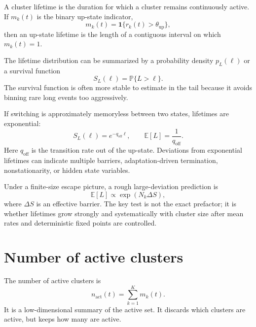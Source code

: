 A cluster lifetime is the duration for which a cluster remains continuously active. If $m_k(t)$ is the binary up-state indicator,
%
\begin{equation}
  m_k(t)
  =
  \mathbf{1}\{r_k(t)>\theta_{\mathrm{up}}\},
  \label{eq:cluster-up-indicator-ch05}
\end{equation}
%
then an up-state lifetime is the length of a contiguous interval on which $m_k(t)=1$.

The lifetime distribution can be summarized by a probability density $p_L(\ell)$ or a survival function
%
\begin{equation}
  S_L(\ell)
  =
  \mathbb{P}\{L>\ell\}.
  \label{eq:cluster-lifetime-survival}
\end{equation}
%
The survival function is often more stable to estimate in the tail because it avoids binning rare long events too aggressively.

If switching is approximately memoryless between two states, lifetimes are exponential:
%
\begin{equation}
  S_L(\ell)
  =
  e^{-q_{\mathrm{off}}\ell},
  \qquad
  \mathbb{E}[L]=\frac{1}{q_{\mathrm{off}}}.
  \label{eq:exponential-lifetime}
\end{equation}
%
Here $q_{\mathrm{off}}$ is the transition rate out of the up-state. Deviations from exponential lifetimes can indicate multiple barriers, adaptation-driven termination, nonstationarity, or hidden state variables.

Under a finite-size escape picture, a rough large-deviation prediction is
%
\begin{equation}
  \mathbb{E}[L]
  \propto
  \exp\!\left(N_k\Delta S\right),
  \label{eq:lifetime-finite-size-scaling-ch05}
\end{equation}
%
where $\Delta S$ is an effective barrier. The key test is not the exact prefactor; it is whether lifetimes grow strongly and systematically with cluster size after mean rates and deterministic fixed points are controlled.

\section{Number of active clusters}
\label{sec:number-active-clusters}

The number of active clusters is
%
\begin{equation}
  n_{\mathrm{act}}(t)
  =
  \sum_{k=1}^{K}m_k(t).
  \label{eq:number-active-clusters}
\end{equation}
%
It is a low-dimensional summary of the active set. It discards which clusters are active, but keeps how many are active.

